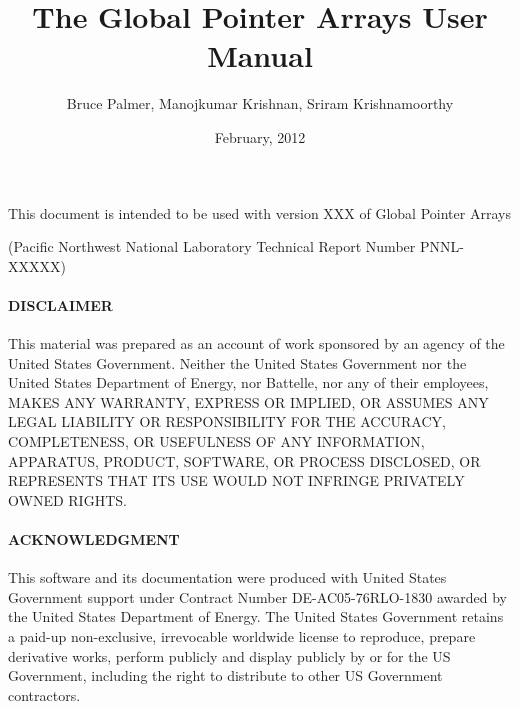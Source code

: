 \documentclass[oneside,english]{book}
\begin{document}
\title{The Global Pointer Arrays User Manual}

\author{Bruce Palmer, Manojkumar Krishnan, Sriram Krishnamoorthy}

\maketitle
\begin{center}
This document is intended to be used with version XXX of Global Pointer Arrays
\par\end{center}

\begin{center}
(Pacific Northwest National Laboratory Technical Report Number PNNL-XXXXX)
\par\end{center}

\paragraph{DISCLAIMER}

This material was prepared as an account of work sponsored by an agency of the
United States Government. Neither the United States Government nor the United
States Department of Energy, nor Battelle, nor any of their employees, MAKES
ANY WARRANTY, EXPRESS OR IMPLIED, OR ASSUMES ANY LEGAL LIABILITY OR
RESPONSIBILITY FOR THE ACCURACY, COMPLETENESS, OR USEFULNESS OF ANY
INFORMATION, APPARATUS, PRODUCT, SOFTWARE, OR PROCESS DISCLOSED, OR REPRESENTS
THAT ITS USE WOULD NOT INFRINGE PRIVATELY OWNED RIGHTS. 

\paragraph{ACKNOWLEDGMENT}

This software and its documentation were produced with United States Government
support under Contract Number DE-AC05-76RLO-1830 awarded by the United States
Department of Energy. The United States Government retains a paid-up
non-exclusive, irrevocable worldwide license to reproduce, prepare derivative
works, perform publicly and display publicly by or for the US Government,
including the right to distribute to other US Government contractors. 

\date{February, 2012}

\tableofcontents{}




\end{document}
